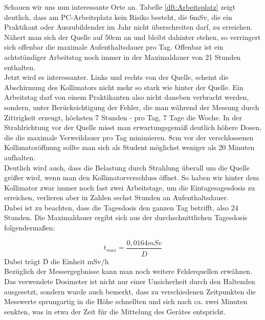 Schauen wir uns nun interessante Orte an. Tabelle \ref{dft:Arbeitsplatz} zeigt deutlich, dass am PC-Arbeitsplatz kein Risiko besteht, die 6mSv, die ein Praktikant oder Auszubildender im Jahr nicht überschreiten darf, zu erreichen. Nähert man sich der Quelle auf 50cm an und bleibt dahinter stehen, so verringert sich offenbar die maximale Aufenthaltsdauer pro Tag. Offenbar ist ein achtstündiger Arbeitstag noch immer in der Maximaldauer von 21 Stunden enthalten. \\
Jetzt wird es interessanter. Links und rechts von der Quelle, scheint die Abschirmung des Kollimators nicht mehr so stark wie hinter der Quelle. Ein Arbeitstag darf von einem Praktikanten also nicht daneben verbracht werden, sondern, unter Berücksichtigung der Fehler, die man während der Messung durch Zittrigkeit erzeugt, höchsten 7 Stunden - pro Tag, 7 Tage die Woche. 
In der Strahlrichtung vor der Quelle misst man erwartungsgemäß deutlich höhere Dosen, die die maximale Verweildauer pro Tag minimieren. 8cm vor der verschlossenen Kollimatoröffnung sollte man sich als Student möglichst weniger als 20 Minuten aufhalten.\\
Deutlich wird auch, dass die Belastung durch Strahlung überall um die Quelle größer wird, wenn man den Kollimatorverschluss öffnet. So haben wir hinter dem Kollimator zwar immer noch fast zwei Arbeitstage, um die Eintagesagesdosis zu erreichen, verlieren aber in Zahlen sechst Stunden an Aufenthaltsdauer. \\
Dabei ist zu beachten, dass die Tagesdosis den ganzen Tag betrifft, also 24 Stunden.
Die Maximaldauer ergibt sich aus der durchschnittlichen Tagesdosis folgendermaßen:

\begin{equation*}
    t_{max} = \frac{0,0164 mSv}{\dot D} 
\end{equation*}
\vspace{2mm}
Dabei trägt \.D die Einheit mSv/h\\
Bezüglich der Messergegbnisse kann man noch weitere Fehlerquellen erwähnen. Das verwendete Dosimeter  ist nicht nur einer Unsicherheit durch den Haltenden ausgesetzt, sondern wurde auch bemerkt, dass zu verschiedenen Zeitpunkten die Messwerte sprungartig in die Höhe schnellten und sich nach ca. zwei Minuten senkten, was in etwa der Zeit für die Mittelung des Gerätes entspricht.


